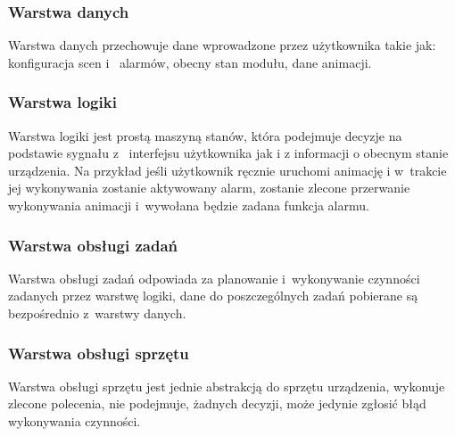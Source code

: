 \documentclass[12pt, eng, twoside, openany, final]{mgr}
\begin{document}
                \subsubsection{Warstwa danych}
                Warstwa danych przechowuje dane wprowadzone przez użytkownika takie jak: konfiguracja scen i~ alarmów, obecny stan modułu, dane animacji.  
                
                \subsubsection{Warstwa logiki}
                Warstwa logiki jest prostą maszyną stanów, która podejmuje decyzje na podstawie sygnału z~ interfejsu użytkownika jak i z informacji o obecnym stanie urządzenia. Na przykład jeśli użytkownik ręcznie uruchomi animację i w~trakcie jej wykonywania zostanie aktywowany alarm, zostanie zlecone przerwanie wykonywania animacji i~wywołana będzie zadana funkcja alarmu.
                
                \subsubsection{Warstwa obsługi zadań}
                Warstwa obsługi zadań odpowiada za planowanie i~wykonywanie czynności zadanych przez warstwę logiki, dane do poszczególnych zadań pobierane są bezpośrednio z~warstwy danych.
                
                \subsubsection{Warstwa obsługi sprzętu}
                Warstwa obsługi sprzętu jest jednie abstrakcją do sprzętu urządzenia, wykonuje zlecone polecenia, nie podejmuje, żadnych decyzji, może jedynie zgłosić błąd wykonywania czynności.
                
                    \newpage
\end{document}
